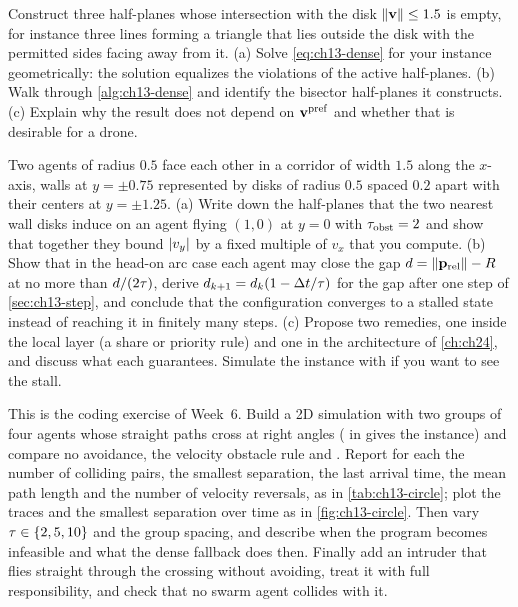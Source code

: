 \begin{exercise}[\difficulty{2}]
\label{exr:ch13-infeasible}
Construct three half-planes whose intersection with the disk
$\left\lVert \mathbf{v} \right\rVert \le 1.5$ is empty, for instance three lines forming a triangle
that lies outside the disk with the permitted sides facing away from it.
(a) Solve \cref{eq:ch13-dense} for your instance geometrically: the solution
equalizes the violations of the active half-planes. (b) Walk through
\cref{alg:ch13-dense} and identify the bisector half-planes it constructs.
(c) Explain why the result does not depend on $\mathbf{v}^{\mathrm{pref}}$ and
whether that is desirable for a drone.
\end{exercise}

\begin{exercise}[\difficulty{2}]
\label{exr:ch13-corridor}
Two agents of radius $0.5$ face each other in a corridor of width $1.5$
along the $x$-axis, walls at $y = \pm 0.75$ represented by disks of radius
$0.5$ spaced $0.2$ apart with their centers at $y = \pm 1.25$. (a) Write down
the half-planes that the two nearest wall disks induce on an agent flying
$(1, 0)$ at $y = 0$ with $\tau_{\mathrm{obst}} = 2$ and show that together
they bound $\left\lvert v_y \right\rvert$ by a fixed multiple of $v_x$ that you compute.
(b) Show that in the head-on arc case each agent may close the gap
$d = \left\lVert \mathbf{p}_{\mathrm{rel}} \right\rVert - R$ at no more than $d/(2\tau)$, derive
$d_{k+1} = d_k(1 - \Delta t/\tau)$ for the gap after one step of
\cref{sec:ch13-step}, and conclude that the configuration converges to a
stalled state instead of reaching it in finitely many steps. (c) Propose two remedies, one
inside the local layer (a share or priority rule) and one in the
architecture of \cref{ch:ch24}, and discuss what each guarantees. Simulate
the instance with  if you want to see the stall.
\end{exercise}

\begin{exercise}
\label{exr:ch13-coding}
This is the coding exercise of Week~6. Build a 2D simulation with two
groups of four agents whose straight paths cross at right angles
( in  gives the instance) and
compare no avoidance, the velocity obstacle rule and \orca. Report for each
the number of colliding pairs, the smallest separation, the last arrival
time, the mean path length and the number of velocity reversals, as in
\cref{tab:ch13-circle}; plot the traces and the smallest separation over time
as in \cref{fig:ch13-circle}. Then vary $\tau \in \left\{ 2, 5, 10 \right\}$ and the
group spacing, and describe when the \orca program becomes infeasible and
what the dense fallback does then. Finally add an intruder that flies
straight through the crossing without avoiding, treat it with full
responsibility, and check that no swarm agent collides with it.
\end{exercise}

